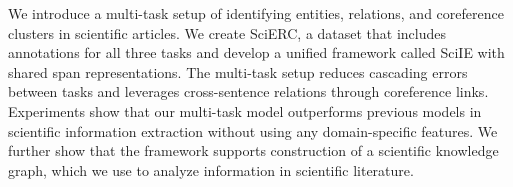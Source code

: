 We introduce a multi-task setup of identifying entities, relations, and coreference clusters in scientific articles. We create SciERC, a dataset that includes annotations for all three tasks and develop a unified framework called SciIE with shared span representations. The multi-task setup reduces cascading errors between tasks and leverages cross-sentence relations through coreference links. Experiments show that our multi-task model outperforms previous models in scientific information extraction without using any domain-specific features. We further show that the framework supports construction of a scientific knowledge graph, which we use to analyze information in scientific literature.
